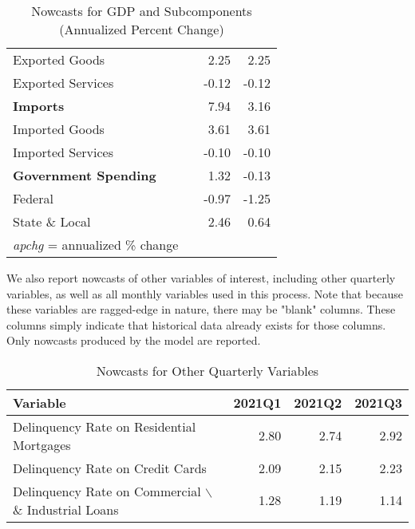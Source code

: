\documentclass[11pt, letterpaper]{article}\usepackage[]{graphicx}\usepackage[]{color}
\begin{document}
\begin{table}[H]
\begin{tabular}{lrrr}
  \hspace{8mm}  Exported Goods &  & 2.25 & 2.25 \\ 
  \hspace{8mm}  Exported Services &  & -0.12 & -0.12 \\ 
  \hspace{0mm} \textbf{Imports} &  & 7.94 & 3.16 \\ 
  \hspace{8mm}  Imported Goods &  & 3.61 & 3.61 \\ 
  \hspace{8mm}  Imported Services &  & -0.10 & -0.10 \\ 
  \hspace{0mm} \textbf{Government Spending} &  & 1.32 & -0.13 \\ 
  \hspace{8mm}  Federal &  & -0.97 & -1.25 \\ 
  \hspace{8mm}  State \& Local &  & 2.46 & 0.64 \\ 
   \hline 
 \textit{apchg} = annualized \% change 
\end{tabular}
\endgroup
\caption{Nowcasts for GDP and Subcomponents (Annualized Percent Change)} 
\end{table}


We also report nowcasts of other variables of interest, including other quarterly variables, as well as all monthly variables used in this process. Note that because these variables are ragged-edge in nature, there may be "blank" columns. These columns simply indicate that historical data already exists for those columns. Only nowcasts produced by the model are reported.
\begin{table}[H]
\centering
\begingroup\fontsize{11pt}{13pt}\selectfont
\begin{tabular}{lrrr}
  \hline
Variable & 2021Q1 & 2021Q2 & 2021Q3 \\ 
  \hline
Delinquency Rate on Residential Mortgages & 2.80 & 2.74 & 2.92 \\ 
  Delinquency Rate on Credit Cards & 2.09 & 2.15 & 2.23 \\ 
  Delinquency Rate on Commercial $\backslash$\& Industrial Loans & 1.28 & 1.19 & 1.14 \\ 
   \hline
\end{tabular}
\endgroup
\caption{Nowcasts for Other Quarterly Variables} 
\end{table}
\end{document}

